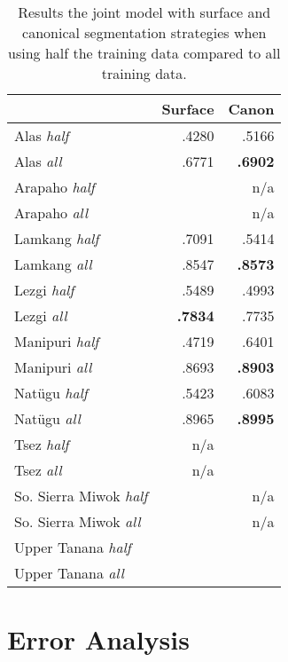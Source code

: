 \begin{table}[h!]
    \centering
    \begin{tabular}{l|rr}
          & \textbf{Surface} & \textbf{Canon} \\
         \hline
         Alas \textit{half} & .4280 & .5166  \\
         Alas \textit{all} & .6771 & \textbf{.6902} \\
         \hline
         Arapaho \textit{half} &  & n/a \\
         Arapaho \textit{all} &  & n/a \\
         \hline
         Lamkang \textit{half} & .7091 & .5414  \\
         Lamkang \textit{all} & .8547 & \textbf{.8573} \\
         \hline
         Lezgi \textit{half} & .5489 & .4993  \\
         Lezgi \textit{all} & \textbf{.7834} & .7735 \\
         \hline
         Manipuri \textit{half} & .4719 & .6401   \\
         Manipuri \textit{all} & .8693 & \textbf{.8903} \\
         \hline
         Natügu \textit{half}  & .5423 & .6083  \\
         Natügu \textit{all} & .8965 & \textbf{.8995} \\
         \hline
         Tsez \textit{half} & n/a &  \\
         Tsez \textit{all} & n/a &  \\
         \hline
         So. Sierra Miwok \textit{half} &  & n/a \\
         So. Sierra Miwok \textit{all} &  & n/a \\
         \hline
         Upper Tanana \textit{half} &  &  \\
         Upper Tanana \textit{\textit{all}} &  &  \\
    \end{tabular}
    \caption[Results of Joint Segmentation and Glossing with Increased Data]{Results the joint model with surface and canonical segmentation strategies when using half the training data compared to all training data.}
    \label{tab:segsizeresults}
\end{table}


\section{Error Analysis}
\label{sec:errors}

